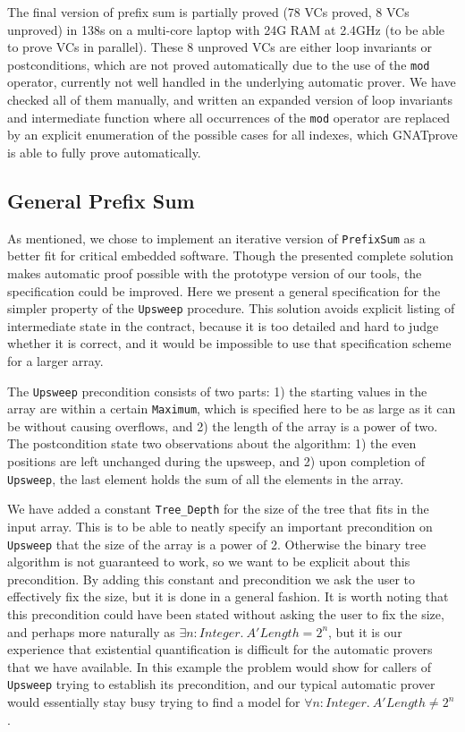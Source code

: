 \documentclass[sttt,final]{svjour}
\newcommand{\gnatprove}{GNATprove\xspace}
\begin{document}
The final version of prefix sum is partially proved (78 VCs proved, 8 VCs
%
%
unproved) in 138s on a multi-core laptop with 24G RAM at 2.4GHz (to
be able to prove VCs in parallel).  These 8 unproved VCs are either loop
invariants or postconditions, which are not proved automatically due to the use
of the \verb|mod| operator, currently not well handled in the underlying
automatic prover. We have checked all of them manually, and written an expanded
version of loop invariants and intermediate function where all occurrences of
the \verb|mod| operator are replaced by an explicit enumeration of the possible
cases for all indexes, which \gnatprove is able to fully prove automatically.

\subsection{General Prefix Sum}
\label{solution2general}
As mentioned, we chose to implement an iterative version of
\verb|PrefixSum| as a better fit for critical embedded software.
Though the presented complete solution makes automatic
proof possible with the prototype version of our tools,
the specification could be improved. Here we present
a general specification for the simpler property of the \verb|Upsweep|
procedure. This solution avoids explicit listing of intermediate state in the
contract, because it is too detailed and hard to judge whether it is
correct, and it would be impossible to use that specification scheme
for a larger array.

The \verb|Upsweep| precondition consists of two parts: 1) the starting
values in the array are within a certain \verb|Maximum|, which is
specified here to be as large as it can be without causing overflows,
and 2) the length of the array is a power of two. The postcondition
state two observations about the algorithm: 1) the even positions are
left unchanged during the upsweep, and 2) upon completion of
\verb|Upsweep|, the last element holds the sum of all the elements in
the array.

We have added a constant \verb|Tree_Depth| for the size of the tree that
fits in the input array. This is to be able to neatly specify an important
precondition on \verb|Upsweep| that the size of the array is a power of
2. Otherwise the binary tree algorithm is not guaranteed to work, so we
want to be explicit about this precondition. By adding this constant and
precondition we ask the user to effectively fix the size, but it is done in
a general fashion. It is worth noting that this precondition could have
been stated without asking the user to fix the size, and perhaps more
naturally as $\exists n: \mathit{Integer}.~ A'\mathit{Length} = 2^n$, but
it is our experience that existential quantification is difficult for the
automatic provers that we have available. In this example the problem would
show for callers of \verb|Upsweep| trying to establish its precondition,
and our typical automatic prover would essentially stay busy trying to find
a model for $\forall n: \mathit{Integer}.~ A'\mathit{Length} \neq 2^n$.
\end{document}
